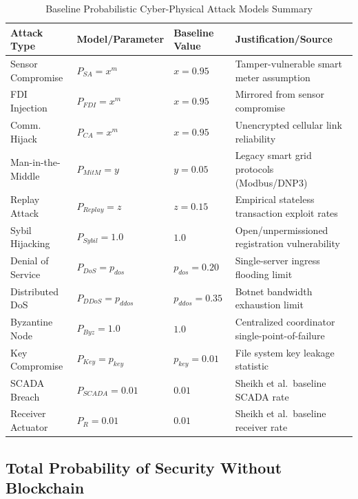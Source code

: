 \documentclass[10pt,twocolumn,journal]{IEEEtran}
\begin{document}
\begin{table}[t]
\caption{Baseline Probabilistic Cyber-Physical Attack Models Summary}
\label{tab:parameter_summary}
\centering
\scriptsize
\begin{tabular}{@{}llll@{}}
\toprule
\textbf{Attack Type} & \textbf{Model/Parameter} & \textbf{Baseline Value} & \textbf{Justification/Source} \\
\midrule
Sensor Compromise & $P_{SA} = x^m$ & $x = 0.95$ & Tamper-vulnerable smart meter assumption~\cite{sridhar2012} \\
FDI Injection & $P_{FDI} = x^m$ & $x = 0.95$ & Mirrored from sensor compromise~\cite{sheikh2020} \\
Comm. Hijack & $P_{CA} = x^m$ & $x = 0.95$ & Unencrypted cellular link reliability~\cite{yan2012} \\
Man-in-the-Middle & $P_{MitM} = y$ & $y = 0.05$ & Legacy smart grid protocols (Modbus/DNP3)~\cite{baumeister2010} \\
Replay Attack & $P_{Replay} = z$ & $z = 0.15$ & Empirical stateless transaction exploit rates~\cite{yan2012} \\
Sybil Hijacking & $P_{Sybil} = 1.0$ & $1.0$ & Open/unpermissioned registration vulnerability~\cite{li2020_blockchain} \\
Denial of Service & $P_{DoS} = p_{dos}$ & $p_{dos} = 0.20$ & Single-server ingress flooding limit~\cite{wang2013} \\
Distributed DoS & $P_{DDoS} = p_{ddos}$ & $p_{ddos} = 0.35$ & Botnet bandwidth exhaustion limit~\cite{wang2013} \\
Byzantine Node & $P_{Byz} = 1.0$ & $1.0$ & Centralized coordinator single-point-of-failure \\
Key Compromise & $P_{Key} = p_{key}$ & $p_{key} = 0.01$ & File system key leakage statistic~\cite{sridhar2012} \\
SCADA Breach & $P_{SCADA} = 0.01$ & $0.01$ & Sheikh et al.\ baseline SCADA rate~\cite{sheikh2020} \\
Receiver Actuator & $P_{R} = 0.01$ & $0.01$ & Sheikh et al.\ baseline receiver rate~\cite{sheikh2020} \\
\bottomrule
\end{tabular}
\end{table}

\subsection{Total Probability of Security Without Blockchain}
\end{document}
